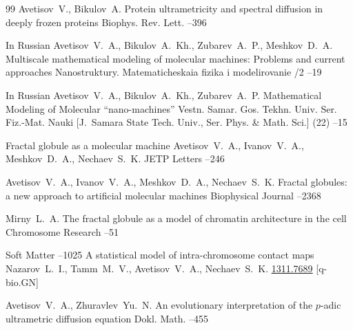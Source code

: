 \begin{thebibliography}{99}
\by Avetisov~V., Bikulov~A.
\paper Protein ultrametricity and spectral diffusion in deeply frozen proteins
\jour Biophys. Rev. Lett. 
--396

\lang In Russian
\by Avetisov~V.~A., Bikulov~A.~Kh., Zubarev~A.~P., Meshkov~D.~A.
\paper Multiscale mathematical modeling of molecular machines: Problems and current approaches
\jour Nanostruktury. Matematicheskaia fizika i modelirovanie
/2
--19

\lang In Russian
\by Avetisov~V.~A., Bikulov~A.~Kh., Zubarev~A.~P.
\paper Mathematical Modeling of Molecular ``nano-machines''
\jour Vestn. Samar. Gos. Tekhn. Univ. Ser. Fiz.-Mat. Nauki \rm [J.~Samara State Tech. Univ., Ser. Phys. \& Math.
Sci.]
(22)
--15


\paper Fractal globule as a molecular machine
\by Avetisov~V.~A., Ivanov~V.~A., Meshkov~D.~A., Nechaev~S.~K.
\jour JETP Letters
--246



\by Avetisov~V.~A., Ivanov~V.~A., Meshkov~D.~A., Nechaev~S.~K.
\paper Fractal globules: a new approach to artificial molecular machines
\jour Biophysical Journal
--2368

\by Mirny~L.~A.
\paper The fractal globule as a model of chromatin architecture in the cell
\jour Chromosome Research
--51

\jour Soft Matter
--1025
\paper A statistical model of intra-chromosome contact maps
\by Nazarov~L.~I., Tamm~M.~V., Avetisov~V.~A., Nechaev~S.~K.
\moreref
\arxiv \href{http://arxiv.org/abs/1311.7689}{1311.7689} [q-bio.GN]


\by Avetisov~V.~A., Zhuravlev~Yu.~N.
\paper An evolutionary interpretation of the $p$-adic ultrametric diffusion equation
\jour Dokl. Math. 
--455 


\end{thebibliography}
